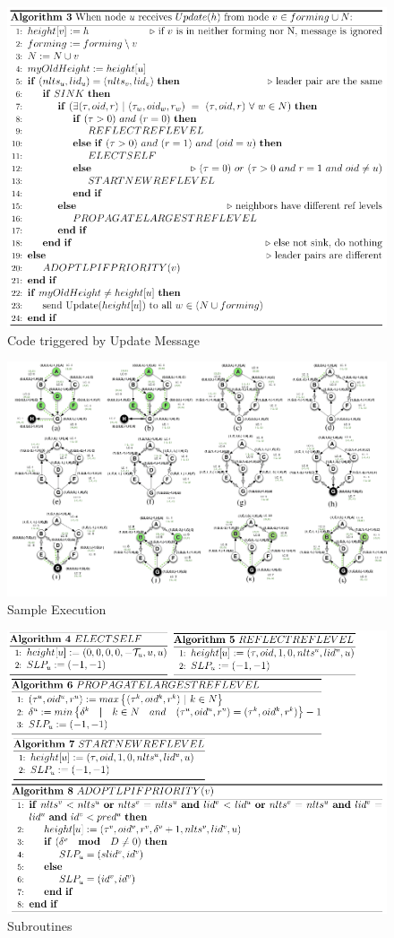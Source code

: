 \documentclass{beamer}
\begin{document}
\begin{frame}
\begin{figure}[h]
	\centering
	\includegraphics[width=0.7\linewidth]{message_received.png}
	\caption{Code triggered by Update Message}
	\label{fig:figure1}
\end{figure}
\end{frame}
\begin{frame}
\begin{figure}[h]
	\centering
	\includegraphics[width=0.9\linewidth]{sample_execution.png}
	\caption{Sample Execution}
	\label{fig:figure1}
\end{figure}
\end{frame}

\begin{frame}
\begin{figure}[h]
	\centering
	\includegraphics[width=0.75\linewidth]{subroutines.png}
	\caption{Subroutines}
	\label{fig:figure1}
\end{figure}
\end{frame}
\end{document}
